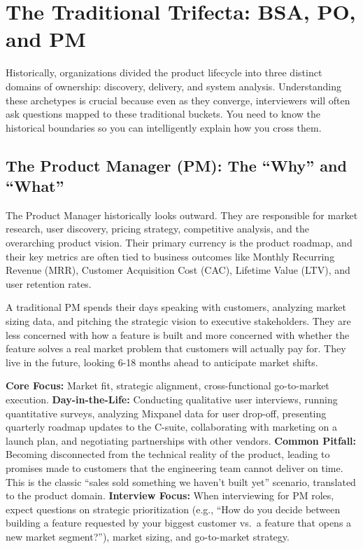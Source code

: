 \documentclass[
  11pt,
  openany,
  oneside]{book}
\begin{document}
\section{The Traditional Trifecta: BSA, PO, and
PM}\label{the-traditional-trifecta-bsa-po-and-pm}

Historically, organizations divided the product lifecycle into three
distinct domains of ownership: discovery, delivery, and system analysis.
Understanding these archetypes is crucial because even as they converge,
interviewers will often ask questions mapped to these traditional
buckets. You need to know the historical boundaries so you can
intelligently explain how you cross them.

\subsection{The Product Manager (PM): The ``Why'' and
``What''}\label{the-product-manager-pm-the-why-and-what}

The Product Manager historically looks outward. They are responsible for
market research, user discovery, pricing strategy, competitive analysis,
and the overarching product vision. Their primary currency is the
product roadmap, and their key metrics are often tied to business
outcomes like Monthly Recurring Revenue (MRR), Customer Acquisition Cost
(CAC), Lifetime Value (LTV), and user retention rates.

A traditional PM spends their days speaking with customers, analyzing
market sizing data, and pitching the strategic vision to executive
stakeholders. They are less concerned with how a feature is built and
more concerned with whether the feature solves a real market problem
that customers will actually pay for. They live in the future, looking
6-18 months ahead to anticipate market shifts.

\textbf{Core Focus:} Market fit, strategic alignment, cross-functional
go-to-market execution. \textbf{Day-in-the-Life:} Conducting qualitative
user interviews, running quantitative surveys, analyzing Mixpanel data
for user drop-off, presenting quarterly roadmap updates to the C-suite,
collaborating with marketing on a launch plan, and negotiating
partnerships with other vendors. \textbf{Common Pitfall:} Becoming
disconnected from the technical reality of the product, leading to
promises made to customers that the engineering team cannot deliver on
time. This is the classic ``sales sold something we haven't built yet''
scenario, translated to the product domain. \textbf{Interview Focus:}
When interviewing for PM roles, expect questions on strategic
prioritization (e.g., ``How do you decide between building a feature
requested by your biggest customer vs.~a feature that opens a new market
segment?''), market sizing, and go-to-market strategy.
\end{document}
